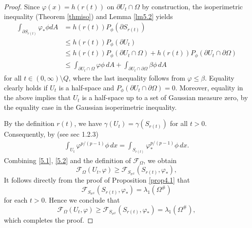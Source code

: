 \documentclass[11pt,leqno]{amsart}
\def\l{\lambda}
\def\p{\partial}
\def \p {\partial}
\numberwithin{equation}{section}
\begin{document}
\begin{proof}
Since $\varphi(x) = h(r(t))$ on $\partial U_{t}\cap \Omega$ by construction, the isoperimetric inequality (Theorem \ref{thmiso}) and Lemma \ref{lm5.2} yields
\begin{align}\label{5.1}
\int_{\partial S_{r(t)}} \varphi_* \phi dA &= h(r(t)) P_{\phi }(\partial S_{r(t)})\nonumber\\
&\leq h(r(t)) P_{\phi }(\partial U_{t}) \nonumber\\
&\leq h(r(t)) P_{\phi }(\partial U_{t}\cap \Omega) + h(r(t)) P_{\phi }(\partial U_{t}\cap \p \Omega) \nonumber\\
&\leq \int_{\partial  U_{t}\cap \Omega} \varphi \phi\, dA + \int_{\partial  U_{t}\cap \p \Omega} \beta \phi\, dA
\end{align}
for all $t \in (0,\infty)\setminus Q$, where the last inequality follows from $\varphi \leq \beta$. Equality clearly holds if $U_t$ is a half-space and $P_{\phi }(\partial U_{t}\cap \p \Omega)=0$. Moreover, equality in the above implies that  $U_t$ is a half-space up to a set of Gaussian measure zero,  by the equality case in the Gaussian isoperimetric inequality.
 
 
By the definition $r(t)$, we have $\gamma(U_t) = \gamma(S_{r(t)})$ for all $t>0$. Consequently, by \cite{Mazja} (see sec 1.2.3)
\begin{align}\label{5.2}
\int_{U_t} \varphi^{p/(p-1)} \phi \, dx = \int_{S_{r(t)}} \varphi_*^{p/(p-1)} \phi \, dx.
\end{align}
Combining \eqref{5.1}, \eqref{5.2} and the definition of  $\mathcal{F}_\Omega$, we obtain
$$
\mathcal{F}_{\Omega}(U_t, \varphi) \geq \mathcal{F}_{S_{\sigma^\#}}(S_{r(t)}, \varphi_*),
$$
It follows directly from the proof of Proposition  \ref{prop4.1} that 
$$
\mathcal{F}_{S_{\sigma^\#}}(S_{r(t)}, \varphi_*)=\l_1(\Omega^\#)
$$
for each $t>0$. Hence we conclude that
$$
\mathcal{F}_{\Omega}(U_t, \varphi) \geq \mathcal{F}_{S_{\sigma^\#}}(S_{r(t)}, \varphi_*)=\l_1(\Omega^\#), 
$$
which completes the proof.
\end{proof}
\end{document}
